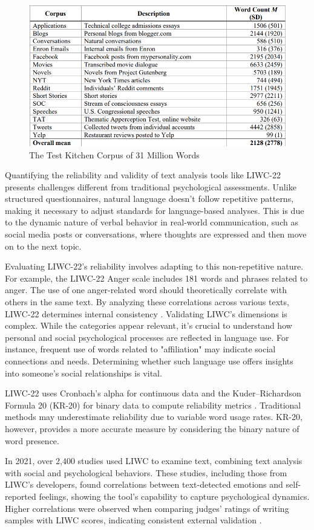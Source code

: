 \begin{figure}[htbp]
	\centering
		\includegraphics[scale=0.65]{./figures/test-kitchen-corpus.png}
	\caption{The Test Kitchen Corpus of 31 Million Words \cite{boyd2022development}}
	\label{FigKitchenCorpus}
\end{figure}

Quantifying the reliability and validity of text analysis tools like LIWC-22 presents challenges different from traditional psychological assessments. Unlike structured questionnaires, natural language doesn't follow repetitive patterns, making it necessary to adjust standards for language-based analyses. This is due to the dynamic nature of verbal behavior in real-world communication, such as social media posts or conversations, where thoughts are expressed and then move on to the next topic.

Evaluating LIWC-22's reliability involves adapting to this non-repetitive nature. For example, the LIWC-22 Anger scale includes 181 words and phrases related to anger. The use of one anger-related word should theoretically correlate with others in the same text. By analyzing these correlations across various texts, LIWC-22 determines internal consistency \cite{boyd2022development}. Validating LIWC's dimensions is complex. While the categories appear relevant, it's crucial to understand how personal and social psychological processes are reflected in language use. For instance, frequent use of words related to "affiliation" may indicate social connections and needs. Determining whether such language use offers insights into someone's social relationships is vital.

LIWC-22 uses Cronbach’s alpha for continuous data and the Kuder–Richardson Formula 20 (KR-20) for binary data to compute reliability metrics \cite{kuder1937theory}. Traditional methods may underestimate reliability due to variable word usage rates. KR-20, however, provides a more accurate measure by considering the binary nature of word presence.

In 2021, over 2,400 studies used LIWC to examine text, combining text analysis with social and psychological behaviors. These studies, including those from LIWC's developers, found correlations between text-detected emotions and self-reported feelings, showing the tool's capability to capture psychological dynamics. Higher correlations were observed when comparing judges' ratings of writing samples with LIWC scores, indicating consistent external validation \cite{boyd2022development}.